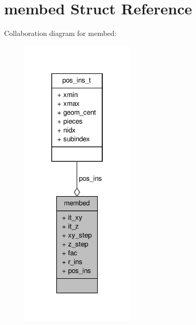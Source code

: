 \hypertarget{structmembed}{\section{membed \-Struct \-Reference}
\label{structmembed}
}


\-Collaboration diagram for membed\-:
\nopagebreak
\begin{figure}[H]
\begin{center}
\leavevmode
\includegraphics[width=154pt]{structmembed__coll__graph}
\end{center}
\end{figure}

